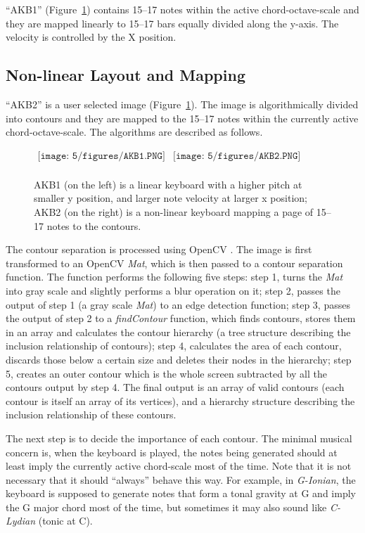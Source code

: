 ``AKB1'' (Figure~\ref{fig:5-AKB12}) contains 15--17 notes within the active chord-octave-scale and they are mapped linearly to 15--17 bars equally divided along the y-axis. The velocity is controlled by the X position.

\subsection{Non-linear Layout and Mapping}
``AKB2'' is a user selected image (Figure~\ref{fig:5-AKB12}). The image is algorithmically divided into contours and they are mapped to the 15--17 notes within the currently active chord-octave-scale. The algorithms are described as follows.
\begin{figure}[htbp]
\begin{center}$
\begin{array}{cc}
\texttt{[image: 5/figures/AKB1.PNG]} &
\texttt{[image: 5/figures/AKB2.PNG]} \\
\end{array}$
\end{center}
\caption{AKB1 (on the left) is a linear keyboard with a higher pitch at smaller y position, and larger note velocity at larger x position; AKB2 (on the right) is a non-linear keyboard mapping a page of 15--17 notes to the contours.}
\label{fig:5-AKB12}
\end{figure}

The contour separation is processed using OpenCV \cite{opencv}. The image is first transformed to an OpenCV \textit{Mat}, which is then passed to a contour separation function. The function performs the following five steps: step 1, turns the \textit{Mat} into gray scale and slightly performs a blur operation on it; step 2, passes the output of step 1 (a gray scale \textit{Mat}) to an edge detection function; step 3, passes the output of step 2 to a \textit{findContour} function, which finds contours, stores them in an array and calculates the contour hierarchy (a tree structure describing the inclusion relationship of contours); step 4, calculates the area of each contour, discards those below a certain size and deletes their nodes in the hierarchy; step 5, creates an outer contour which is the whole screen subtracted by all the contours output by step 4. The final output is an array of valid contours (each contour is itself an array of its vertices), and a hierarchy structure describing the inclusion relationship of these contours.

The next step is to decide the importance of each contour. The minimal musical concern is, when the keyboard is played, the notes being generated should at least imply the currently active chord-scale most of the time. Note that it is not necessary that it should ``always'' behave this way. For example, in \textit{G-Ionian}, the keyboard is supposed to generate notes that form a tonal gravity at G and imply the G major chord most of the time, but sometimes it may also sound like \textit{C-Lydian} (tonic at C).

